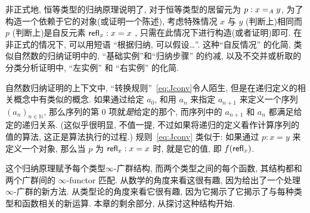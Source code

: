 非正式地, 恒等类型的归纳原理说明了, 对于恒等类型的居留元为 $p:\id[A]xy$, 为了构造一个依赖于它的对象(或证明一个陈述), 考虑特殊情况 $x$ 与 $y$ (判断上)相同而 $p$ (判断上)是自反元素 $\refl{x}:x=x$ , 只需在此情况下进行构造(或者证明)即可.
在非正式的情况下, 可以用短语 ``根据归纳, 可以假设\dots''.
这种``自反情况'' 的化简, 类似自然数的归纳证明中的, ``基础实例''和``归纳步骤'' 的约减, 以及不交并或析取的分类分析证明中, ``左实例'' 和 ``右实例'' 的化简.
%


自然数归纳证明的上下文中, ``转换规则''~\eqref{eq:Jconv}令人陌生, 但是在递归定义的相关概念中有类似的概念.
如果通过给定 $a_0$, 和用 $a_n$ 来指定 $a_{n+1}$ 来定义一个序列 $(a_n)_{n\in \mathbb{N}}$, 那么序列的第 $0$ 项就\emph{是}给定的那个, 而序列中的 $a_{n+1}$ 和 $a_n$ 都满足给定的递归关系.
(这似乎很明显, 不值一提, 不过如果将递归的定义看作计算序列的值的算法, 这正是算法执行的过程.)
规则~\eqref{eq:Jconv} 类似于: 如果通过 $p:x=y$ 来定义一个对象, 那么当 $p$ 为 $\refl{x}:x=x$ 时, 就是它的值, 即 $f(\refl{x})$.

这个归纳原理赋予每个类型$\infty$-广群结构, 而两个类型之间的每个函数, 其结构都和两个广群间的 $\infty$-functor
%
匹配.
从数学的角度来看这很有趣, 因为给出了一个处理 $\infty$-广群的新方法.
从类型论的角度来看它很有趣, 因为它揭示了它揭示了与每种类型和函数相关的新运算.
本章的剩余部分, 从探讨这种结构开始.